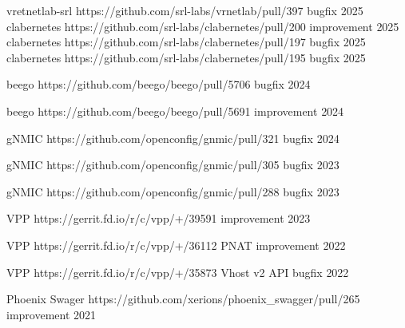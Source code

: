 

\begin{cvhonors}



  \cvhonor
    {vretnetlab-srl} %
    {https://github.com/srl-labs/vrnetlab/pull/397}
    {bugfix} %
    {2025} %
  \cvhonor
    {clabernetes} %
    {https://github.com/srl-labs/clabernetes/pull/200}
    {improvement} %
    {2025} %
  \cvhonor
    {clabernetes} %
    {https://github.com/srl-labs/clabernetes/pull/197}
    {bugfix} %
    {2025} %
  \cvhonor
    {clabernetes} %
    {https://github.com/srl-labs/clabernetes/pull/195}
    {bugfix} %
    {2025} %

  \cvhonor
    {beego} %
    {https://github.com/beego/beego/pull/5706}
    {bugfix} %
    {2024} %

  \cvhonor
    {beego} %
    {https://github.com/beego/beego/pull/5691}
    {improvement} %
    {2024} %

  \cvhonor
    {gNMIC} %
    {https://github.com/openconfig/gnmic/pull/321}
    {bugfix} %
    {2024} %

  \cvhonor
    {gNMIC} %
    {https://github.com/openconfig/gnmic/pull/305}
    {bugfix} %
    {2023} %

  \cvhonor
    {gNMIC} %
    {https://github.com/openconfig/gnmic/pull/288}
    {bugfix} %
    {2023} %

  \cvhonor
    {VPP} %
    {https://gerrit.fd.io/r/c/vpp/+/39591}
    {improvement} %
    {2023} %

  \cvhonor
    {VPP} %
    {https://gerrit.fd.io/r/c/vpp/+/36112}
    {PNAT improvement} %
    {2022} %

  \cvhonor
    {VPP} %
    {https://gerrit.fd.io/r/c/vpp/+/35873}
    {Vhost v2 API bugfix} %
    {2022} %

  \cvhonor
    {Phoenix Swager} %
    {https://github.com/xerions/phoenix\_swagger/pull/265}
    {improvement} %
    {2021} %


\end{cvhonors}
